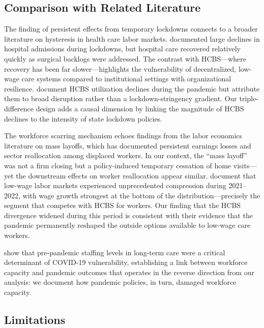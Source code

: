 \documentclass[12pt]{article}
\begin{document}
\subsection{Comparison with Related Literature}

The finding of persistent effects from temporary lockdowns connects to a broader literature on hysteresis in health care labor markets. \citet{birkmeyer2020impact} documented large declines in hospital admissions during lockdowns, but hospital care recovered relatively quickly as surgical backlogs were addressed. The contrast with HCBS---where recovery has been far slower---highlights the vulnerability of decentralized, low-wage care systems compared to institutional settings with organizational resilience. \citet{werner2022hcbs} document HCBS utilization declines during the pandemic but attribute them to broad disruption rather than a lockdown-stringency gradient. Our triple-difference design adds a causal dimension by linking the magnitude of HCBS declines to the intensity of state lockdown policies.

The workforce scarring mechanism echoes findings from the labor economics literature on mass layoffs, which has documented persistent earnings losses and sector reallocation among displaced workers. In our context, the ``mass layoff'' was not a firm closing but a policy-induced temporary cessation of home visits---yet the downstream effects on worker reallocation appear similar. \citet{autor2023compression} document that low-wage labor markets experienced unprecedented compression during 2021--2022, with wage growth strongest at the bottom of the distribution---precisely the segment that competes with HCBS for workers. Our finding that the HCBS divergence widened during this period is consistent with their evidence that the pandemic permanently reshaped the outside options available to low-wage care workers.

\citet{gorges2020staffing} show that pre-pandemic staffing levels in long-term care were a critical determinant of COVID-19 vulnerability, establishing a link between workforce capacity and pandemic outcomes that operates in the reverse direction from our analysis: we document how pandemic policies, in turn, damaged workforce capacity.

\subsection{Limitations}
\end{document}
